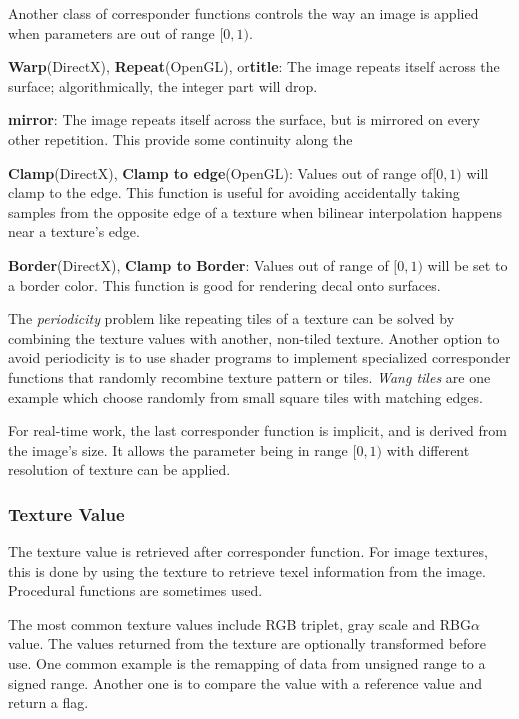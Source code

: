 \documentclass[10pt, a4paper]{article}
\begin{document}
        Another class of corresponder functions controls the way an image is applied when parameters are out of range $[0, 1)$.

        \textbf{Warp}(DirectX), \textbf{Repeat}(OpenGL), or\textbf{title}: The image repeats itself across the surface; algorithmically, the integer part will drop. 
        
        \textbf{mirror}: The image repeats itself across the surface, but is mirrored on every other repetition. This provide some continuity along the 

        \textbf{Clamp}(DirectX), \textbf{Clamp to edge}(OpenGL): Values out of range of$[0, 1)$ will clamp to the edge. This function is useful for avoiding accidentally taking samples from the opposite edge of a texture when bilinear interpolation happens near a texture's edge. 

        \textbf{Border}(DirectX), \textbf{Clamp to Border}: Values out of range of $[0, 1)$ will be set to a border color. This function is good for rendering decal onto surfaces. 

        The \emph{periodicity} problem like repeating tiles of a texture can be solved by combining the texture values with another, non-tiled texture. Another option to avoid periodicity is to use shader programs to implement specialized corresponder functions that randomly recombine texture pattern or tiles. \emph{Wang tiles} are one example which choose randomly from small square tiles with matching edges. 

        For real-time work, the last corresponder function is implicit, and is derived from the image's size. It allows the parameter being in range  $[0, 1)$ with different resolution of texture can be applied. 
\subsubsection{Texture Value}
    The texture value is retrieved after corresponder function. For image textures, this is done by using the texture to retrieve texel information from the image. Procedural functions are sometimes used. 
    
    The most common texture values include RGB triplet, gray scale and RBG$\alpha$ value. The values returned from the texture are optionally transformed before use. One common example is the remapping of data from unsigned range to a signed range. Another one is to compare the value with a reference value and return a flag.
    
\end{document}
